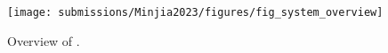 \begin{figure}[t]
    \centering
    \texttt{[image: submissions/Minjia2023/figures/fig\_system\_overview]}
    \caption{Overview of \Hammer.}
    \label{minjia_fig:fig_system_overview}
\end{figure}


%
%
%
%
%
